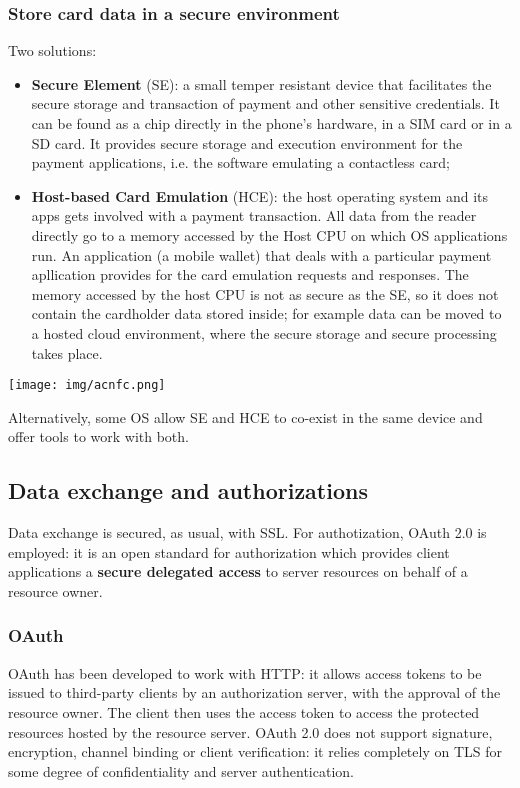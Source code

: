 \documentclass[a4paper, 10pt, titlepage]{article}
\begin{document}
\subsubsection*{Store card data in a secure environment}
Two solutions:
\begin{itemize}
\item \textbf{Secure Element} (SE): a small temper resistant device that facilitates the secure storage and transaction of payment and other sensitive credentials. It can be found as a chip directly in the phone's hardware, in a SIM card or in a SD card. It provides secure storage and execution environment for the payment applications, i.e. the software emulating a contactless card;
\item \textbf{Host-based Card Emulation} (HCE): the host operating system and its apps gets involved with a payment transaction. All data from the reader directly go to a memory accessed by the Host CPU on which OS applications run. An application (a mobile wallet) that deals with a particular payment apllication provides for the card emulation requests and responses. The memory accessed by the host CPU is not as secure as the SE, so it does not contain the cardholder data stored inside; for example data can be moved to a hosted cloud environment, where the secure storage and secure processing takes place.
\end{itemize}
\begin{center}
\texttt{[image: img/acnfc.png]}
\end{center}
Alternatively, some OS allow SE and HCE to co-exist in the same device and offer tools to work with both.

\subsection{Data exchange and authorizations}
Data exchange is secured, as usual, with SSL. For authotization, OAuth 2.0 is employed: it is an open standard for authorization which provides client applications a \textbf{secure delegated access} to server resources on behalf of a resource owner.

\subsubsection*{OAuth}
OAuth has been developed to work with HTTP: it allows access tokens to be issued to third-party clients by an authorization server, with the approval of the resource owner. The client then uses the access token to access the protected resources hosted by the resource server. OAuth 2.0 does not support signature, encryption, channel binding or client verification: it relies completely on TLS for some degree of confidentiality and server authentication.
\end{document}
